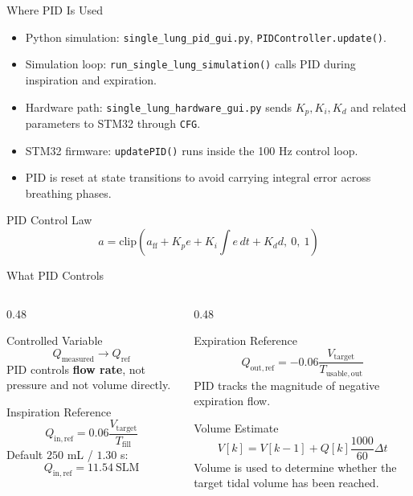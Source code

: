 \documentclass[aspectratio=169,10pt]{beamer}
\newcommand{\code}[1]{\texttt{\small #1}}
\newcommand{\highlight}[1]{\textcolor{lungblue}{\textbf{#1}}}
\begin{document}
\begin{frame}{Where PID Is Used}
  \begin{itemize}
    \item Python simulation: \code{single\_lung\_pid\_gui.py}, \code{PIDController.update()}.
    \item Simulation loop: \code{run\_single\_lung\_simulation()} calls PID during inspiration and expiration.
    \item Hardware path: \code{single\_lung\_hardware\_gui.py} sends $K_p,K_i,K_d$ and related parameters to STM32 through \code{CFG}.
    \item STM32 firmware: \code{updatePID()} runs inside the 100 Hz control loop.
    \item PID is reset at state transitions to avoid carrying integral error across breathing phases.
  \end{itemize}

  \vspace{0.4em}
  \begin{block}{PID Control Law}
    \[
      a=\mathrm{clip}\left(
      a_{\mathrm{ff}}+K_p e+K_i\int e\,dt+K_d d,\ 0,\ 1
      \right)
    \]
  \end{block}
\end{frame}

\begin{frame}{What PID Controls}
  \begin{columns}[T,onlytextwidth]
    \begin{column}{0.48\textwidth}
      \begin{block}{Controlled Variable}
        \[
          Q_{\mathrm{measured}}\rightarrow Q_{\mathrm{ref}}
        \]
        PID controls \highlight{flow rate}, not pressure and not volume directly.
      \end{block}

      \begin{block}{Inspiration Reference}
        \[
          Q_{\mathrm{in,ref}}=0.06\frac{V_{\mathrm{target}}}{T_{\mathrm{fill}}}
        \]
        Default $250$ mL / $1.30$ s:
        \[
          Q_{\mathrm{in,ref}}=11.54\ \mathrm{SLM}
        \]
      \end{block}
    \end{column}
    \begin{column}{0.48\textwidth}
      \begin{block}{Expiration Reference}
        \[
          Q_{\mathrm{out,ref}}=-0.06
          \frac{V_{\mathrm{target}}}{T_{\mathrm{usable,out}}}
        \]
        PID tracks the magnitude of negative expiration flow.
      \end{block}

      \begin{block}{Volume Estimate}
        \[
          V[k]=V[k-1]+Q[k]\frac{1000}{60}\Delta t
        \]
        Volume is used to determine whether the target tidal volume has been reached.
      \end{block}
    \end{column}
  \end{columns}
\end{frame}
\end{document}
